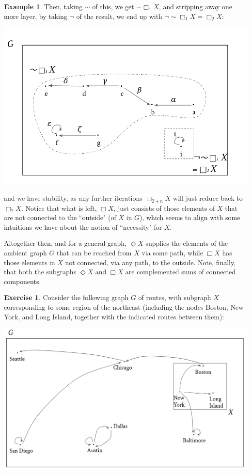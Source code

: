 \documentclass[11pt]{book}
\theoremstyle{definition}
\newtheorem{example}{Example}[section]
\theoremstyle{definition}
\theoremstyle{definition}
\theoremstyle{theorem}
\theoremstyle{definition}
\newtheorem{exercise}{Exercise}[section]
\begin{document}
\begin{example}
	Then, taking $\sim$ of this, we get $\sim \Box_1 X$, and stripping away one more layer, by taking $\neg$ of the result, we end up with $\neg \sim \Box_1 X = \Box_2 X$:
	\begin{center}
		\includegraphics*[scale=0.24]{GraphSubgraphNegation13.png}
	\end{center}  
	and we have stability, as any further iterations $\Box_{2 +n} X$ will just reduce back to $\Box_2 X$. Notice that what is left, $\Box X$, just consists of those elements of $X$ that are not connected to the ``outside" (of $X$ in $G$), which seems to align with some intuitions we have about the notion of ``necessity" for $X$.  \par 
	Altogether then, and for a general graph, $\Diamond X$ supplies the elements of the ambient graph $G$ that can be reached from $X$ via some path, while $\Box X$ has those elements in $X$ not connected, via any path, to the outside. Note, finally, that both the subgraphs $\Diamond X$ and $\Box X$ are complemented sums of connected components.   
	\begin{exercise} Consider the following graph $G$ of routes, with subgraph $X$ corresponding to some region of the northeast (including the nodes Boston, New York, and Long Island, together with the indicated routes between them): 
	\begin{center}
		\includegraphics*[scale=0.2]{RoutesGraph.png}

\end{center}
\end{exercise}
\end{example}
\end{document}
